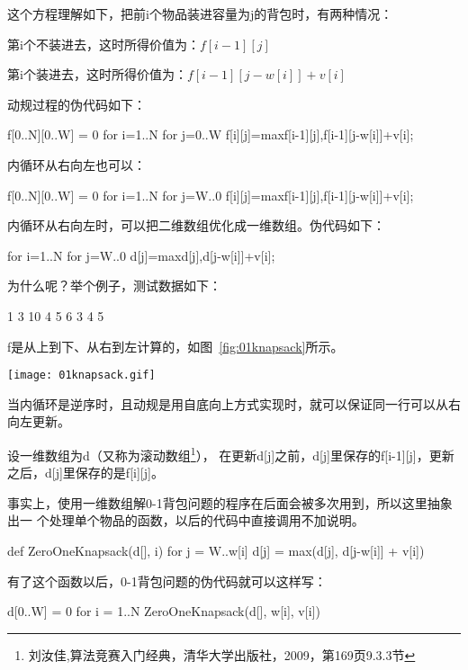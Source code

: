这个方程理解如下，把前i个物品装进容量为j的背包时，有两种情况：
\begindot
\item 第i个不装进去，这时所得价值为：$f[i-1][j]$
\item 第i个装进去，这时所得价值为：$f[i-1][j-w[i]]+v[i]$
\myenddot

动规过程的伪代码如下：
\begin{Code}
f[0..N][0..W] = 0
for i=1..N
    for j=0..W
        f[i][j]=max{f[i-1][j],f[i-1][j-w[i]]+v[i]};
\end{Code}

内循环从右向左也可以：
\begin{Code}
f[0..N][0..W] = 0
for i=1..N
    for j=W..0
        f[i][j]=max{f[i-1][j],f[i-1][j-w[i]]+v[i]};
\end{Code}

内循环从右向左时，可以把二维数组优化成一维数组。伪代码如下：
\begin{Code}
for i=1..N
    for j=W..0
        d[j]=max{d[j],d[j-w[i]]+v[i]};
\end{Code}

为什么呢？举个例子，测试数据如下：
\begin{Code}
1
3 10
4 5 6
3 4 5
\end{Code}

f是从上到下、从右到左计算的，如图~\ref{fig:01knapsack}所示。
\begin{center}
\texttt{[image: 01knapsack.gif]}\\
\label{fig:01knapsack}
\end{center}

当内循环是逆序时，且动规是用自底向上方式实现时，就可以保证同一行可以从右向左更新。

设一维数组为d（又称为滚动数组\footnote{刘汝佳,算法竞赛入门经典，清华大学出版社，2009，第169页9.3.3节}），
在更新d[j]之前，d[j]里保存的f[i-1][j]，更新之后，d[j]里保存的是f[i][j]。

事实上，使用一维数组解0-1背包问题的程序在后面会被多次用到，所以这里抽象出一
个处理单个物品的函数，以后的代码中直接调用不加说明。
\begin{Code}
def ZeroOneKnapsack(d[], i)
    for j = W..w[i]
        d[j] = max(d[j], d[j-w[i]] + v[i])
\end{Code}

有了这个函数以后，0-1背包问题的伪代码就可以这样写：
\begin{Code}
d[0..W] = 0
for i = 1..N
    ZeroOneKnapsack(d[], w[i], v[i])
\end{Code}

